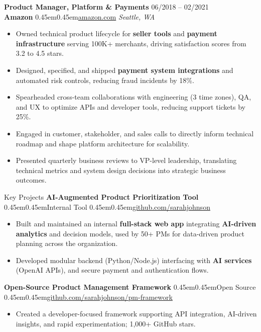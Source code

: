 \documentclass[10pt, letterpaper]{article}
\makeatletter
\renewcommand{\section}{%
  \@startsection{section}{1}{\z@}{10pt}{6pt}{%
    \Large\bfseries\color{black}%
  }%
}
\newcommand{\bull}{\kern0.45em\textbullet\kern0.45em}
\newcommand{\role}[1]{\textbf{#1}}
\newcommand{\org}[1]{\textbf{#1}}
\newcommand{\place}[1]{\textit{#1}}
\makeatother
\begin{document}
\role{Product Manager, Platform \& Payments} \hfill 06/2018 -- 02/2021 \\
\org{Amazon} \bull \href{https://amazon.com}{amazon.com} \hfill \place{Seattle, WA}
\begin{itemize}
  \item Owned technical product lifecycle for \textbf{seller tools} and \textbf{payment infrastructure} serving 100K+ merchants, driving satisfaction scores from 3.2 to 4.5 stars.
  \item Designed, specified, and shipped \textbf{payment system integrations} and automated risk controls, reducing fraud incidents by 18\%.
  \item Spearheaded cross-team collaborations with engineering (3 time zones), QA, and UX to optimize APIs and developer tools, reducing support tickets by 25\%.
  \item Engaged in customer, stakeholder, and sales calls to directly inform technical roadmap and shape platform architecture for scalability.
  \item Presented quarterly business reviews to VP-level leadership, translating technical metrics and system design decisions into strategic business outcomes.
\end{itemize}
\vspace{12pt}

\section{Key Projects}
\org{AI-Augmented Product Prioritization Tool} \bull Internal Tool \bull \href{https://github.com/sarahjohnson}{github.com/sarahjohnson}
\begin{itemize}
  \item Built and maintained an internal \textbf{full-stack web app} integrating \textbf{AI-driven analytics} and decision models, used by 50+ PMs for data-driven product planning across the organization.
  \item Developed modular backend (Python/Node.js) interfacing with \textbf{AI services} (OpenAI APIs), and secure payment and authentication flows.
\end{itemize}
\org{Open-Source Product Management Framework} \bull Open Source \bull \href{https://github.com/sarahjohnson/pm-framework}{github.com/sarahjohnson/pm-framework}
\begin{itemize}
  \item Created a developer-focused framework supporting API integration, AI-driven insights, and rapid experimentation; 1,000+ GitHub stars.
\end{itemize}
\end{document}
